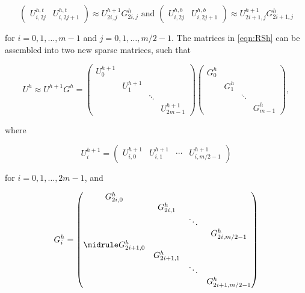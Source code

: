 \begin{equation}
  \begin{pmatrix}
    U^{h,t}_{i,2j} &  U^{h,t}_{i,2j+1}
  \end{pmatrix}
  \approx U^{h+1}_{2i,j} G^{h}_{2i,j}
  \text{   and    }
  \begin{pmatrix}
    U^{h,b}_{i,2j} & U^{h,b}_{i,2j+1}
  \end{pmatrix}
  \approx U^{h+1}_{2i+1,j} G^{h}_{2i+1,j}
  \label{eqn:RSh}
\end{equation}

for $i=0,1,\dots,m-1$ and $j=0,1,\dots,m/2-1$.  The matrices in
\eqref{eqn:RSh} can be assembled into two new sparse matrices, such that

\begin{equation*}
U^h \approx U^{h+1}G^{h}=
\begin{pmatrix}
U^{h+1}_{0} & & &\\
 & U^{h+1}_{1} & &\\
 & & \ddots &\\
 & & & U^{h+1}_{2m-1}
\end{pmatrix}
\begin{pmatrix}
G^{h}_{0} & & &\\
 & G^{h}_{1} & &\\
 & & \ddots &\\
 & & & G^{h}_{m-1}
\end{pmatrix},
\end{equation*}

where

\begin{equation*}
U_{i}^{h+1}=
\begin{pmatrix}
U^{h+1}_{i,0} & U^{h+1}_{i,1} & \cdots & U^{h+1}_{i,m/2-1}
\end{pmatrix}
\end{equation*}

for $i=0,1,\dots,2m-1$, and

\begin{equation*}
G^{h}_{i}=
\begin{pmatrix}
G^{h}_{2i,0} & & &\\
 & G^{h}_{2i,1} & &\\
 & & \ddots &\\
 & & & G^{h}_{2i,m/2-1}\\
\midrule
G^{h}_{2i+1,0} & & &\\
 & G^{h}_{2i+1,1} & &\\
 & & \ddots &\\
 & & & G^{h}_{2i+1,m/2-1}
\end{pmatrix}
\end{equation*}

